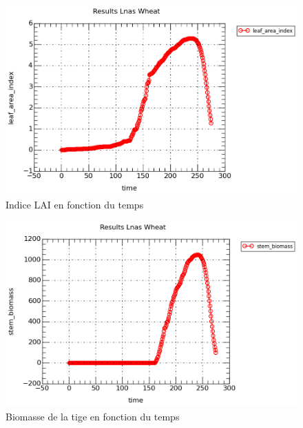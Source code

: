 \begin{figure}

\begin{center}
 \includegraphics[scale = 0.3]{./img/LAI.png}
 \caption{Indice LAI en fonction du temps}
 \label{fig:resultatLAI}
\end{center}

\end{figure}

\begin{figure}

\begin{center}
 \includegraphics[scale = 0.5]{./img/stem.png}
 \caption{Biomasse de la tige en fonction du temps}
 \label{fig:resultatStem}
\end{center}

\end{figure}


